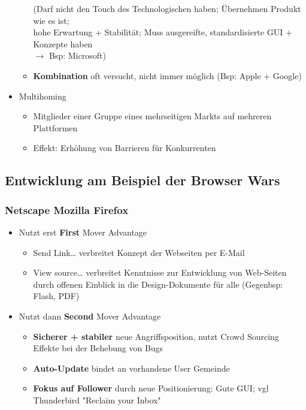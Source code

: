 \documentclass{article} %
\begin{document}
\begin{itemize}
\begin{itemize}
(Darf nicht den Touch des Technologischen haben; Übernehmen Produkt wie es ist;\\
hohe Erwartung + Stabilität; Muss ausgereifte, standardisierte GUI + Konzepte haben \\
$\rightarrow$ Bsp: Microsoft)
				\item \textbf{Kombination} oft versucht, nicht immer möglich (Bsp: Apple + Google)
			\end{itemize}
			\item Multihoming
			\begin{itemize}
				\item Mitglieder einer Gruppe eines mehrseitigen Markts
auf mehreren Plattformen
				\item Effekt: Erhöhung von Barrieren für Konkurrenten
			\end{itemize}
		\end{itemize}
	\subsection{Entwicklung am Beispiel der Browser Wars}
		\subsubsection{Netscape Mozilla Firefox}
		\begin{itemize}
			\item Nutzt erst \textbf{First} Mover Advantage
			\begin{itemize}
				\item Send Link… verbreitet Konzept der Webseiten per E-Mail
				\item View source… verbreitet Kenntnisse zur Entwicklung von Web-Seiten durch offenen Einblick in die Design-Dokumente für alle (Gegenbsp: Flash, PDF)
			\end{itemize}
			\item Nutzt dann \textbf{Second} Mover Advantage
			\begin{itemize}
				\item \textbf{Sicherer + stabiler} neue Angriffsposition, nutzt Crowd Sourcing Effekte bei der Behebung von Bugs
				\item \textbf{Auto-Update} bindet an vorhandene User Gemeinde
				\item \textbf{Fokus auf Follower} durch neue Positionierung: Gute GUI; vgl Thunderbird
"Reclaim your Inbox"
			\end{itemize}
		\end{itemize}
\end{document}
